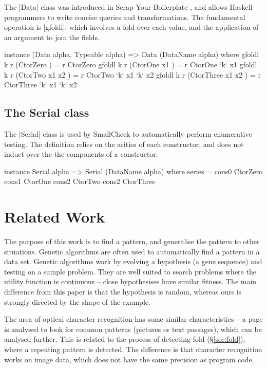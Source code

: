 \documentclass{llncs}
\begin{document}
The |Data| class was introduced in Scrap Your Boilerplate \cite{lammel:syb}, and allows Haskell programmers to write concise queries and transformations. The fundamental operation is |gfoldl|, which involves a fold over each value, and the application of an argument to join the fields.

\begin{code}
instance (Data alpha, Typeable alpha) => Data (DataName alpha) where
    gfoldl k r (CtorZero          ) = r CtorZero
    gfoldl k r (CtorOne    x1     ) = r CtorOne    `k` x1
    gfoldl k r (CtorTwo    x1 x2  ) = r CtorTwo    `k` x1 `k` x2
    gfoldl k r (CtorThree  x1 x2  ) = r CtorThree  `k` x1 `k` x2
\end{code}

\subsection{The Serial class}

The |Serial| class is used by SmallCheck \cite{smallcheck} to automatically perform enumerative testing. The definition relies on the arities of each constructor, and does not induct over the the components of a constructor.

\begin{code}
instance Serial alpha => Serial (DataName alpha) where
    series = cons0 CtorZero \/ cons1 CtorOne  \/ cons2 CtorTwo  \/ cons2 CtorThree
\end{code}

\section{Related Work}
\label{sec:related}

The purpose of this work is to find a pattern, and generalise the pattern to other situations. Genetic algorithms \cite{genetic_algorithms} are often used to automatically find a pattern in a data set. Genetic algorithms work by evolving a hypothesis (a gene sequence) and testing on a sample problem. They are well suited to search problems where the utility function is continuous -- close hypothesises have similar fitness. The main difference from this paper is that the hypothesis is random, whereas ours is strongly directed by the shape of the example.

The area of optical character recognition \cite{ocr} has some similar characteristics -- a page is analysed to look for common patterns (pictures or text passages), which can be analysed further. This is related to the process of detecting fold (\S\ref{sec:fold}), where a repeating pattern is detected. The difference is that character recognition works on image data, which does not have the same precision as program code.
\end{document}
